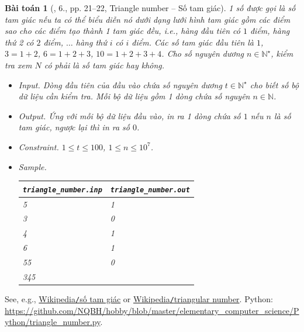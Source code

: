 \documentclass{article}
\newtheorem{baitoan}{Bài toán}
\begin{document}
\begin{baitoan}[\cite{Duc_200_BT_Python}, 6., pp. 21--22, Triangle number -- Số tam giác]
	1 số được gọi là \emph{số tam giác} nếu ta có thể biểu diễn nó dưới dạng lưới hình tam giác gồm các điểm sao cho các điểm tạo thành 1 tam giác đều, i.e., hàng đầu tiên có $1$ điểm, hàng thứ 2 có $2$ điểm, $\ldots$ hàng thứ $i$ có $i$ điểm. Các số tam giác đầu tiên là $1$, $3 = 1 + 2$, $6 = 1 + 2 + 3$, $10 = 1 + 2 + 3 + 4$. Cho số nguyên dương $n\in\mathbb{N}^\star$, kiểm tra xem $N$ có phải là số tam giác hay không. 
	\begin{itemize}
		\item {\sf Input.} Dòng đầu tiên của đầu vào chứa số nguyên dương $t\in\mathbb{N}^\star$ cho biết số bộ dữ liệu cần kiểm tra. Mỗi bộ dữ liệu gồm 1 dòng chứa số nguyên $n\in\mathbb{N}$.
		\item {\sf Output.} Ứng với mỗi bộ dữ liệu đầu vào, in ra 1 dòng chứa số $1$ nếu $n$ là số tam giác, ngược lại thì in ra số $0$.
		\item {\sf Constraint.} $1\le t\le100$, $1\le n\le10^7$.
		\item {\sf Sample.}
		\begin{table}[H]
			\centering
			\begin{tabular}{|l|l|}
				\hline
				\verb|triangle_number.inp| & \verb|triangle_number.out| \\
				\hline
				5 & 1 \\
				3 & 0 \\
				4 & 1 \\
				6 & 1 \\
				55 & 0 \\
				345 & \\
				\hline
			\end{tabular}
		\end{table}
	\end{itemize}
\end{baitoan}
See, e.g., \href{https://vi.wikipedia.org/wiki/S%E1%BB%91_tam_gi%C3%A1c}{Wikipedia{\tt /}số tam giác} or \href{https://en.wikipedia.org/wiki/Triangular_number}{Wikipedia{\tt /}triangular number}.
\newpage
Python: \url{https://github.com/NQBH/hobby/blob/master/elementary_computer_science/Python/triangle_number.py}.
\end{document}
